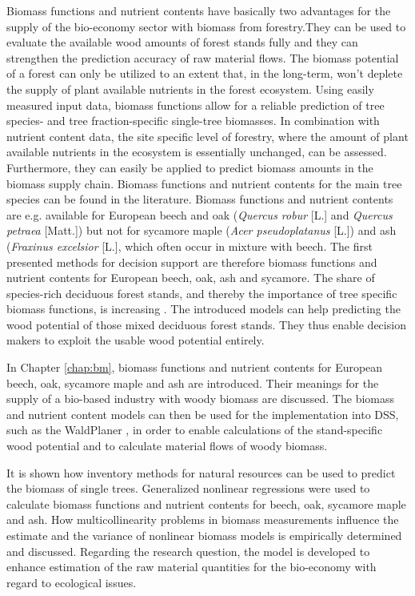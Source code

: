 Biomass functions and nutrient contents have basically two advantages for the supply of the bio-economy sector with biomass from forestry.They can be used to evaluate the available wood amounts of forest stands fully and they can strengthen the prediction accuracy of raw material flows. The biomass potential of a forest can only be utilized to an extent that, in the long-term, won't deplete the supply of plant available nutrients in the forest ecosystem. Using easily measured input data, biomass functions allow for a reliable prediction of tree species- and tree fraction-specific single-tree biomasses. In combination with nutrient content data, the site specific level of forestry, where the amount of plant available nutrients in the ecosystem is essentially unchanged, can be assessed. Furthermore, they can easily be applied to predict biomass amounts in the biomass supply chain. Biomass functions and nutrient contents for the main tree species can be found in the literature. Biomass functions and nutrient contents are e.g. available for European beech and oak (\textit{Quercus robur} [L.] and \textit{Quercus petraea} [Matt.]) but not for sycamore maple (\textit{Acer pseudoplatanus} [L.]) and ash (\textit{Fraxinus excelsior} [L.], which often occur in mixture with beech. The first presented methods for decision support are therefore biomass functions and nutrient contents for European beech, oak, ash and sycamore. The share of species-rich deciduous forest stands, and thereby the importance of tree specific biomass functions, is increasing \citep{ti_2014}. The introduced models can help predicting the wood potential of those mixed deciduous forest stands. They thus enable decision makers to exploit the usable wood potential entirely.

In Chapter \ref{chap:bm}, biomass functions and nutrient contents for European beech, oak, sycamore maple and ash are introduced. Their meanings for the supply of a bio-based industry with woody biomass are discussed. The biomass and nutrient content models can then be used for the implementation into DSS, such as the WaldPlaner \citep{hansen_2014}, in order to enable calculations of the stand-specific wood potential and to calculate material flows of woody biomass.

It is shown how inventory methods for natural resources can be used to predict the biomass of single trees. Generalized nonlinear regressions were used to calculate biomass functions and nutrient contents for beech, oak, sycamore maple and ash. How multicollinearity problems in biomass measurements influence the estimate and the variance of nonlinear biomass models is empirically determined and discussed. Regarding the research question, the model is developed to enhance estimation of the raw material quantities for the bio-economy with regard to ecological issues.

